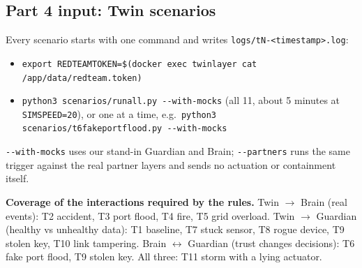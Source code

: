 \documentclass[10pt,a4paper]{article}
\renewcommand{\_}{\textunderscore\allowbreak}
\begin{document}
\subsection*{Part 4 input: Twin scenarios}
Every scenario starts with one command and writes \texttt{logs/tN-<timestamp>.log}:
\begin{itemize}[leftmargin=*,itemsep=0pt,topsep=1pt]
  \item \texttt{export RED\_TEAM\_TOKEN=\$(docker exec twin\_layer cat /app/data/red\_team.token)}
  \item \texttt{python3 scenarios/run\_all.py -{}-with-mocks} (all 11, about 5 minutes at \texttt{SIM\_SPEED=20}), or one at a time, e.g.\ \texttt{python3 scenarios/t6\_fake\_port\_flood.py -{}-with-mocks}
\end{itemize}
\texttt{-{}-with-mocks} uses our stand-in Guardian and Brain; \texttt{-{}-partners} runs the same trigger against the real partner layers and sends no actuation or containment itself.

\textbf{Coverage of the interactions required by the rules.} Twin $\to$ Brain (real events): T2 accident, T3 port flood, T4 fire, T5 grid overload. Twin $\to$ Guardian (healthy vs unhealthy data): T1 baseline, T7 stuck sensor, T8 rogue device, T9 stolen key, T10 link tampering. Brain $\leftrightarrow$ Guardian (trust changes decisions): T6 fake port flood, T9 stolen key. All three: T11 storm with a lying actuator.
\end{document}
